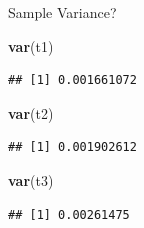\documentclass[
  ignorenonframetext,
]{beamer}
\newenvironment{Shaded}{\begin{snugshade}}{\end{snugshade}}
\newcommand{\FunctionTok}[1]{\textcolor[rgb]{0.13,0.29,0.53}{\textbf{#1}}}
\newcommand{\NormalTok}[1]{#1}
\begin{document}
\begin{frame}[fragile]{Sample Variance?}
\protect{}\label{sample-variance}
\begin{Shaded}
\begin{Highlighting}[]
\FunctionTok{var}\NormalTok{(t1)}
\end{Highlighting}
\end{Shaded}

\begin{verbatim}
## [1] 0.001661072
\end{verbatim}

\begin{Shaded}
\begin{Highlighting}[]
\FunctionTok{var}\NormalTok{(t2)}
\end{Highlighting}
\end{Shaded}

\begin{verbatim}
## [1] 0.001902612
\end{verbatim}

\begin{Shaded}
\begin{Highlighting}[]
\FunctionTok{var}\NormalTok{(t3)}
\end{Highlighting}
\end{Shaded}

\begin{verbatim}
## [1] 0.00261475
\end{verbatim}
\end{frame}
\end{document}
